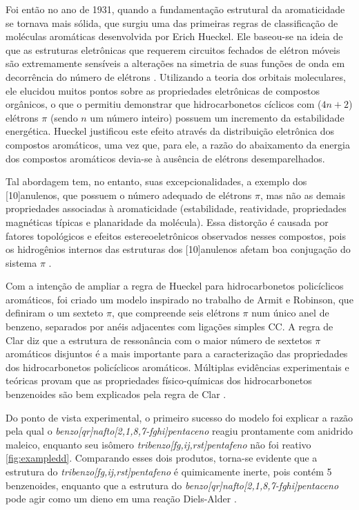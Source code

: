 Foi então no ano de 1931, quando a fundamentação estrutural da aromaticidade se tornava mais sólida, que surgiu uma das primeiras regras de classificação de moléculas aromáticas desenvolvida por Erich Hueckel\autocite{Hckel1931}. Ele baseou-se na ideia de que as estruturas eletrônicas que requerem circuitos fechados de elétron móveis são extremamente sensíveis a alterações na simetria de suas funções de onda em decorrência do número de elétrons \autocite{Hckel1931, Schleyer1996, Schleyer2001}. Utilizando a teoria dos orbitais moleculares, ele elucidou muitos pontos sobre as propriedades eletrônicas de compostos orgânicos, o que o permitiu demonstrar que hidrocarbonetos cíclicos com ($4n+2$) elétrons $\pi$ (sendo $n$ um número inteiro) possuem um incremento da estabilidade energética. Hueckel\autocite{Hckel1931, Brogli1972} justificou este efeito através da distribuição eletrônica dos compostos aromáticos, uma vez que, para ele, a razão do abaixamento da energia dos compostos aromáticos devia-se à ausência de elétrons desemparelhados.

Tal abordagem tem, no entanto, suas excepcionalidades, a exemplo dos [10]anulenos, que possuem o número adequado de elétrons $\pi$, mas não as demais propriedades associadas à aromaticidade (estabilidade, reatividade, propriedades magnéticas típicas e planaridade da molécula). Essa distorção é causada por fatores topológicos e efeitos estereoeletrônicos observados nesses compostos, pois os hidrogênios internos das estruturas dos [10]anulenos afetam boa conjugação do sistema $\pi$ \autocite{Caramori2006}. 

Com a intenção de ampliar a regra de Hueckel para hidrocarbonetos policíclicos aromáticos, foi criado um modelo inspirado no trabalho de Armit e Robinson, que definiram o um sexteto $\pi$, que compreende seis elétrons $\pi$ num único anel de benzeno, separados por anéis adjacentes com ligações simples CC. A regra de Clar diz que a estrutura de ressonância com o maior número de sextetos $\pi$ aromáticos disjuntos é a mais importante para a caracterização das propriedades dos hidrocarbonetos policíclicos aromáticos. Múltiplas evidências experimentais e teóricas provam que as propriedades físico-químicas dos hidrocarbonetos benzenoides são bem explicados pela regra de Clar \autocite{Sola2013}. 

Do ponto de vista experimental, o primeiro sucesso do modelo foi explicar a razão pela qual o \textit{benzo[qr]nafto[2,1,8,7-fghi]pentaceno}
reagiu prontamente com anidrido maleico, enquanto seu isômero \textit{tribenzo[fg,ij,rst]pentafeno} não foi reativo \autoref{fig:exampledd}. Comparando esses dois produtos, torna-se evidente que a estrutura do \textit{tribenzo[fg,ij,rst]pentafeno} é quimicamente inerte, pois contém 5 benzenoides, enquanto que a estrutura do \textit{benzo[qr]nafto[2,1,8,7-fghi]pentaceno} pode agir como um dieno em uma reação Diels-Alder \autocite{Clar1958}.

